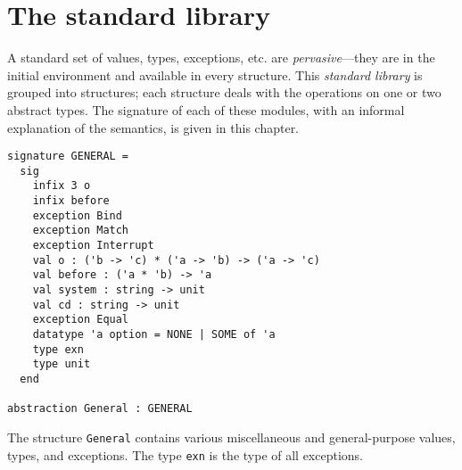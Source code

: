 \chapter{The standard library}
\label{library}

A standard set of values, types, exceptions, etc. are {\em
pervasive}---they are in the initial environment and available in
every structure.  This {\em standard library} is grouped into
structures; each structure deals with the operations on one or two
abstract types.  The signature of each of these modules, with an
informal explanation of the semantics, is given in this chapter.

\begin{verbatim}
signature GENERAL =
  sig
    infix 3 o
    infix before
    exception Bind
    exception Match
    exception Interrupt
    val o : ('b -> 'c) * ('a -> 'b) -> ('a -> 'c)
    val before : ('a * 'b) -> 'a
    val system : string -> unit
    val cd : string -> unit
    exception Equal
    datatype 'a option = NONE | SOME of 'a
    type exn
    type unit
  end

abstraction General : GENERAL
\end{verbatim}
The structure \verb"General" contains various miscellaneous and
general-purpose values, types, and exceptions.  The type \verb"exn"
is the type of all exceptions.

